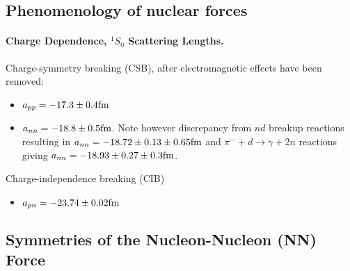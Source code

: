 \documentclass[%
twoside,                 %
final,                   %
10pt]{article}
\begin{document}
\noindent



\subsection*{Phenomenology of nuclear forces}

\paragraph{Charge Dependence, $^1S_0$ Scattering Lengths.}

Charge-symmetry breaking (CSB), after electromagnetic effects
have been removed:
\begin{itemize}
\item $a_{pp}=  -17.3 \pm 0.4 \hspace{0.cm} \mathrm{fm}$

\item $a_{nn}=-18.8 \pm 0.5 \hspace{0.cm} \mathrm{fm}$. Note however discrepancy from $nd$ breakup reactions resulting in  $a_{nn}=-18.72 \pm 0.13 \pm 0.65 \hspace{0.cm} \mathrm{fm}$ and $\pi^- + d \rightarrow \gamma + 2n$ reactions giving  $a_{nn}=-18.93 \pm 0.27 \pm 0.3 \hspace{0.cm} \mathrm{fm}$.
\end{itemize}

\noindent
Charge-independence breaking (CIB)
\begin{itemize}
\item $a_{pn}=  -23.74 \pm 0.02 \hspace{0.cm} \mathrm{fm}$ 
\end{itemize}

\noindent





\subsection*{Symmetries of the Nucleon-Nucleon (NN) Force}

\end{document}
